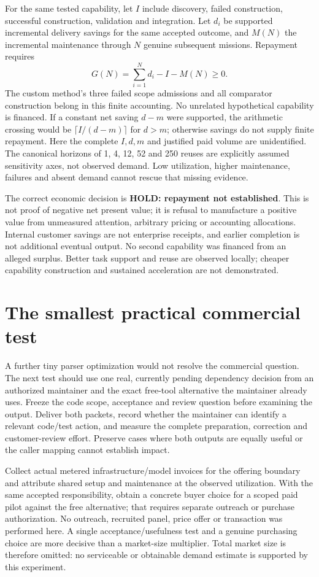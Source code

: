 \documentclass[11pt,letterpaper]{article}
\begin{document}
For the same tested capability, let $I$ include discovery, failed construction, successful construction, validation and integration. Let $d_i$ be supported incremental delivery savings for the same accepted outcome, and $M(N)$ the incremental maintenance through $N$ genuine subsequent missions. Repayment requires
\[
       G(N)=\sum_{i=1}^{N}d_i-I-M(N)\geq 0.
\]
The custom method's three failed scope admissions and all comparator construction belong in this finite accounting. No unrelated hypothetical capability is financed. If a constant net saving $d-m$ were supported, the arithmetic crossing would be $\lceil I/(d-m)\rceil$ for $d>m$; otherwise savings do not supply finite repayment. Here the complete $I,d,m$ and justified paid volume are unidentified. The canonical horizons of 1, 4, 12, 52 and 250 reuses are explicitly assumed sensitivity axes, not observed demand. Low utilization, higher maintenance, failures and absent demand cannot rescue that missing evidence.

The correct economic decision is \textbf{HOLD: repayment not established}. This is not proof of negative net present value; it is refusal to manufacture a positive value from unmeasured attention, arbitrary pricing or accounting allocations. Internal customer savings are not enterprise receipts, and earlier completion is not additional eventual output. No second capability was financed from an alleged surplus. Better task support and reuse are observed locally; cheaper capability construction and sustained acceleration are not demonstrated.

\section{The smallest practical commercial test}
A further tiny parser optimization would not resolve the commercial question. The next test should use one real, currently pending dependency decision from an authorized maintainer and the exact free-tool alternative the maintainer already uses. Freeze the code scope, acceptance and review question before examining the output. Deliver both packets, record whether the maintainer can identify a relevant code/test action, and measure the complete preparation, correction and customer-review effort. Preserve cases where both outputs are equally useful or the caller mapping cannot establish impact.

Collect actual metered infrastructure/model invoices for the offering boundary and attribute shared setup and maintenance at the observed utilization. With the same accepted responsibility, obtain a concrete buyer choice for a scoped paid pilot against the free alternative; that requires separate outreach or purchase authorization. No outreach, recruited panel, price offer or transaction was performed here. A single acceptance/usefulness test and a genuine purchasing choice are more decisive than a market-size multiplier. Total market size is therefore omitted: no serviceable or obtainable demand estimate is supported by this experiment.
\end{document}
